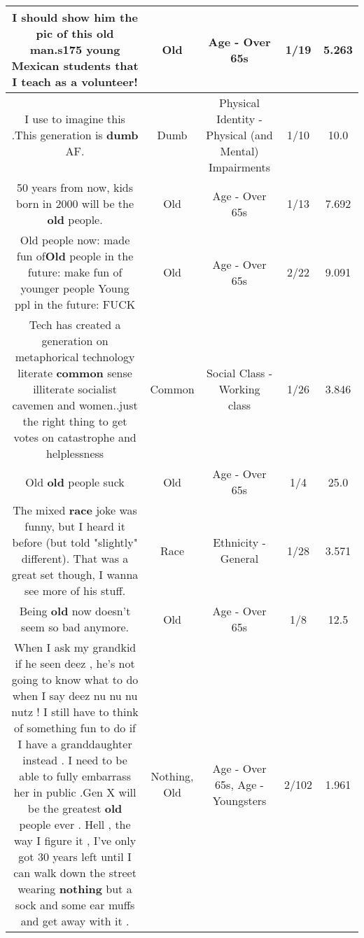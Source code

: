 \documentclass[11pt]{article}
\newlength\mylength
\begin{document}
\begin{center}
\begin{longtable}{|C{.65\mylength}|C{.30\mylength}|C{.12\mylength}|C{.12\mylength}|C{.12\mylength}|}
  \small I should show him the pic of this \textbf{old} man.s175 young Mexican students  that I teach as a volunteer!\normalsize   & Old & Age - Over 65s & 1/19 & 5.263 \\  \hline
  \small I use to imagine this .This generation is \textbf{dumb} AF.\normalsize   & Dumb & Physical Identity - Physical (and Mental) Impairments & 1/10 & 10.0 \\  \hline
  \small 50 years from now, kids born in 2000 will be the \textbf{old} people.\normalsize   & Old & Age - Over 65s & 1/13 & 7.692 \\  \hline
  \small Old people now: made fun of\textbf{Old} people in the future: make fun of younger people Young ppl in the future: FUCK\normalsize   & Old & Age - Over 65s & 2/22 & 9.091 \\  \hline
  \small Tech has created a generation on metaphorical technology literate \textbf{common} sense illiterate socialist cavemen and women..just the right thing to get votes on catastrophe and helplessness\normalsize   & Common & Social Class - Working class & 1/26 & 3.846 \\  \hline
  \small Old \textbf{old} people suck\normalsize   & Old & Age - Over 65s & 1/4 & 25.0 \\  \hline
  \small The mixed \textbf{race} joke was funny, but I heard it before (but told "slightly" different).  That was a great set though, I wanna see more of his stuff.\normalsize   & Race & Ethnicity - General & 1/28 & 3.571 \\  \hline
  \small Being \textbf{old} now doesn't seem so bad anymore.\normalsize   & Old & Age - Over 65s & 1/8 & 12.5 \\  \hline
  \small When I ask my grandkid if he seen deez , he's not going to know what to do when I say deez nu nu nu nutz ! I still have to think of something fun to do if I have a granddaughter instead . I need to be able to fully embarrass her in public .Gen X will be the greatest \textbf{old} people ever . Hell , the way I figure it , I've only got 30 years left until I can walk down the street wearing \textbf{nothing} but a sock  and some ear muffs and get away with it .\normalsize   & Nothing, Old & Age - Over 65s, Age - Youngsters & 2/102 & 1.961 \\  \hline

\end{longtable}
\end{center}
\end{document}

